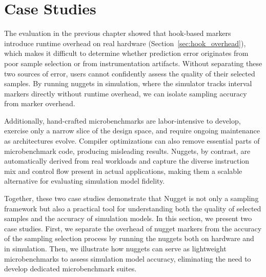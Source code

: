 \section{Case Studies}\label{sec:case_study}

The evaluation in the previous chapter showed that hook-based markers introduce runtime overhead on real hardware (Section~\ref{sec:hook_overhead}), which makes it difficult to determine whether prediction error originates from poor sample selection or from instrumentation artifacts.
Without separating these two sources of error, users cannot confidently assess the quality of their selected samples.
By running nuggets in simulation, where the simulator tracks interval markers directly without runtime overhead, we can isolate sampling accuracy from marker overhead.

Additionally, hand-crafted microbenchmarks are labor-intensive to develop, exercise only a narrow slice of the design space, and require ongoing maintenance as architectures evolve.
Compiler optimizations can also remove essential parts of microbenchmark code, producing misleading results.
Nuggets, by contrast, are automatically derived from real workloads and capture the diverse instruction mix and control flow present in actual applications, making them a scalable alternative for evaluating simulation model fidelity.

Together, these two case studies demonstrate that Nugget is not only a sampling framework but also a practical tool for understanding both the quality of selected samples and the accuracy of simulation models.
In this section, we present two case studies.
First, we separate the overhead of nugget markers from the accuracy of the sampling selection process by running the nuggets both on hardware and in simulation.
Then, we illustrate how nuggets can serve as lightweight microbenchmarks to assess simulation model accuracy, eliminating the need to develop dedicated microbenchmark suites.
